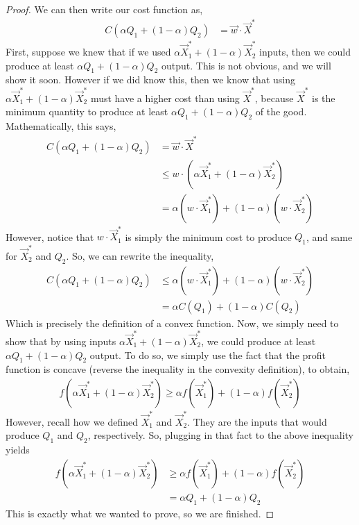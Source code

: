 \begin{description}
\begin{proof}
        We can then write our cost function as,
        \begin{align*}
            C(\alpha Q_1 + (1 - \alpha) Q_2) &= \vec{w} \cdot \vec{X}^*
        \end{align*}
        First, suppose we knew that if we used $\alpha \vec{X}_1^* + (1 - \alpha) \vec{X}_2^*$ inputs, then we could produce at least $\alpha Q_1 + (1 - \alpha) Q_2$ output. This is not obvious, and we will show it soon. However if we did know this, then we know that using $\alpha \vec{X}_1^* + (1 - \alpha) \vec{X}_2^*$ must have a higher cost than using $\vec{X}^*$, because $\vec{X}^*$ is the minimum quantity to produce at least $\alpha Q_1 + (1 - \alpha) Q_2$ of the good. Mathematically, this says,
        \begin{align*}
            C(\alpha Q_1 + (1 - \alpha) Q_2) &= \vec{w} \cdot \vec{X}^* \\
            &\leq w \cdot (\alpha \vec{X}_1^* + (1 - \alpha) \vec{X}_2^*) \\
            &= \alpha (w \cdot \vec{X}_1^*) + (1 - \alpha) (w \cdot \vec{X}_2^*)
        \end{align*}
        However, notice that $w \cdot \vec{X}_1^*$ is simply the minimum cost to produce $Q_1$, and same for $\vec{X}_2^*$ and $Q_2$. So, we can rewrite the inequality, 
        \begin{align*}
            C(\alpha Q_1 + (1 - \alpha) Q_2) &\leq \alpha (w \cdot \vec{X}_1^*) + (1 - \alpha) (w \cdot \vec{X}_2^*) \\
            &= \alpha C(Q_1) + (1 - \alpha)C(Q_2)
        \end{align*}
        Which is precisely the definition of a convex function. Now, we simply need to show that by using inputs $\alpha \vec{X}_1^* + (1 - \alpha) \vec{X}_2^*$, we could produce at least $\alpha Q_1 + (1 - \alpha) Q_2$ output. To do so, we simply use the fact that the profit function is concave (reverse the inequality in the convexity definition), to obtain,
        \begin{align*}
            f(\alpha \vec{X}_1^* + (1 - \alpha) \vec{X}_2^*) \geq \alpha f(\vec{X}_1^*) + (1 - \alpha) f(\vec{X}_2^*)
        \end{align*}
        However, recall how we defined $\vec{X}_1^*$ and $\vec{X}_2^*$. They are the inputs that would produce $Q_1$ and $Q_2$, respectively. So, plugging in that fact to the above inequality yields 
        \begin{align*}
            f(\alpha \vec{X}_1^* + (1 - \alpha) \vec{X}_2^*) &\geq \alpha f(\vec{X}_1^*) + (1 - \alpha) f(\vec{X}_2^*) \\
            &= \alpha Q_1 + (1 - \alpha) Q_2
        \end{align*}
        This is exactly what we wanted to prove, so we are finished.
    \end{proof}
    
\end{description}


